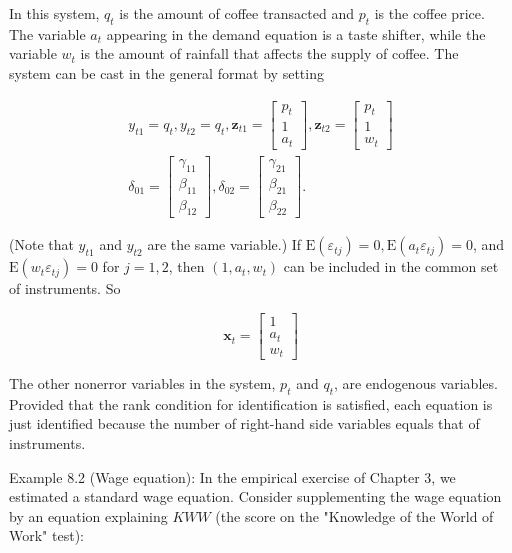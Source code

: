 \documentclass[10pt]{article}
\begin{document}
In this system, $q_{t}$ is the amount of coffee transacted and $p_{t}$ is the coffee price. The variable $a_{t}$ appearing in the demand equation is a taste shifter, while the variable $w_{t}$ is the amount of rainfall that affects the supply of coffee. The\\
system can be cast in the general format by setting

$$
\begin{gathered}
y_{t 1}=q_{t}, y_{t 2}=q_{t}, \mathbf{z}_{t 1}=\left[\begin{array}{c}
p_{t} \\
1 \\
a_{t}
\end{array}\right], \mathbf{z}_{t 2}=\left[\begin{array}{c}
p_{t} \\
1 \\
w_{t}
\end{array}\right] \\
\delta_{01}=\left[\begin{array}{l}
\gamma_{11} \\
\beta_{11} \\
\beta_{12}
\end{array}\right], \delta_{02}=\left[\begin{array}{l}
\gamma_{21} \\
\beta_{21} \\
\beta_{22}
\end{array}\right] .
\end{gathered}
$$

(Note that $y_{t 1}$ and $y_{t 2}$ are the same variable.) If $\mathrm{E}\left(\varepsilon_{t j}\right)=0, \mathrm{E}\left(a_{t} \varepsilon_{t j}\right)=0$, and $\mathrm{E}\left(w_{t} \varepsilon_{t j}\right)=0$ for $j=1,2$, then $\left(1, a_{t}, w_{t}\right)$ can be included in the common set of instruments. So

$$
\mathbf{x}_{t}=\left[\begin{array}{c}
1 \\
a_{t} \\
w_{t}
\end{array}\right]
$$

The other nonerror variables in the system, $p_{t}$ and $q_{t}$, are endogenous variables. Provided that the rank condition for identification is satisfied, each equation is just identified because the number of right-hand side variables equals that of instruments.

Example 8.2 (Wage equation): In the empirical exercise of Chapter 3, we estimated a standard wage equation. Consider supplementing the wage equation by an equation explaining $K W W$ (the score on the "Knowledge of the World of Work" test):
\end{document}
